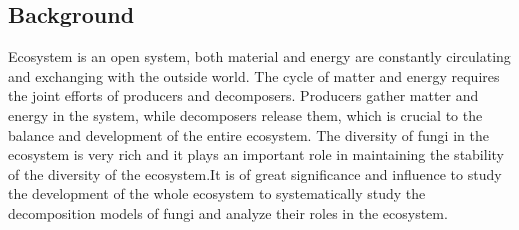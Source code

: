 \subsection{Background}
Ecosystem is an open system, both material and energy are constantly circulating and exchanging with the outside world. The cycle of matter and energy requires the joint efforts of producers and decomposers. Producers gather matter and energy in the system, while decomposers release them, which is crucial to the balance and development of the entire ecosystem. The diversity of fungi in the ecosystem is very rich and it plays an important role in maintaining the stability of the diversity of the ecosystem.It is of great significance and influence to study the development of the whole ecosystem to systematically study the decomposition models of fungi and analyze their roles in the ecosystem.
